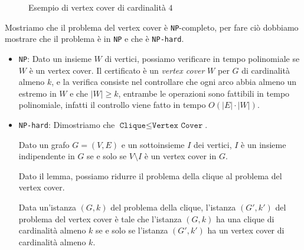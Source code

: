 \begin{figure}[H]
    \centering 
    \caption{Esempio di vertex cover di cardinalità $4$}
\end{figure}

Mostriamo che il problema del vertex cover è \texttt{NP}-completo, per fare ciò
dobbiamo mostrare che il problema è in \texttt{NP} e che è \texttt{NP-hard}.

\begin{itemize}
    \item \texttt{NP}: Dato un insieme $W$ di vertici, possiamo verificare in tempo polinomiale
    se $W$ è un vertex cover. Il certificato è un \textit{vertex cover} $W$ per $G$ di cardinalità
    almeno $k$, e la verifica consiste nel controllare che ogni arco abbia almeno un estremo in $W$
    e che $|W| \geq k$, entrambe le operazioni sono fattibili in tempo polinomiale, infatti il controllo
    viene fatto in tempo $O(|E| \cdot |W|)$.
    \item \texttt{NP-hard}: Dimostriamo che $\texttt{Clique} \leq \texttt{Vertex Cover}$.

\begin{lemma}
    Dato un grafo $G = (V,E)$ e un sottoinsieme $I$ dei vertici, $I$ è un insieme indipendente
    in $G$ se e solo se $V \setminus I$ è un vertex cover in $G$.
\end{lemma}
    Dato il lemma, possiamo ridurre il problema della clique al problema del vertex cover.

    Data un'istanza $(G, k)$ del problema della clique, l'istanza $(G', k')$ del problema del vertex
    cover è tale che l'istanza $(G, k)$ ha una clique di cardinalità almeno $k$ se e solo se l'istanza
    $(G', k')$ ha un vertex cover di cardinalità almeno $k$.
\end{itemize}